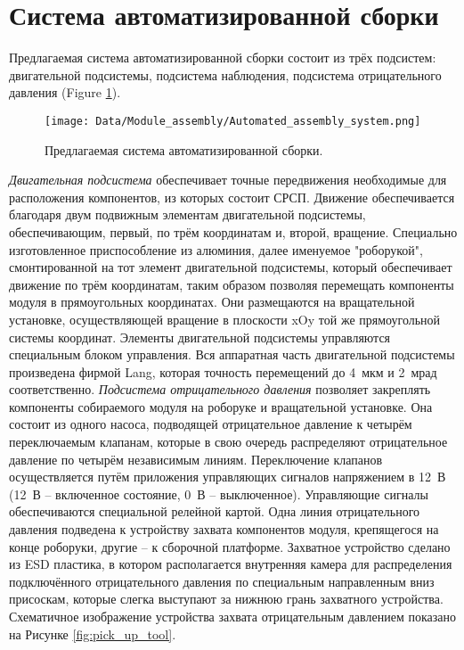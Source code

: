 \section{Система автоматизированной сборки}

Предлагаемая система автоматизированной сборки состоит из трёх подсистем: двигательной подсистемы, подсистема наблюдения, подсистема отрицательного давления (Figure \ref{fig:auto_assembly_system})\cite{AutomatedAssembly_tutorial}.

\begin{figure}[ht]\centering
\texttt{[image: Data/Module\_assembly/Automated\_assembly\_system.png]}
\caption{Предлагаемая система автоматизированной сборки.}
\label{fig:auto_assembly_system}
\end{figure}

\emph{Двигательная подсистема} обеспечивает точные передвижения необходимые для расположения компонентов, из которых состоит СРСП. Движение обеспечивается благодаря двум подвижным элементам двигательной подсистемы, обеспечивающим, первый, по трём координатам и, второй, вращение. Специально изготовленное приспособление из алюминия, далее именуемое "роборукой", смонтированной на тот элемент двигательной подсистемы, который обеспечивает движение по трём координатам, таким образом позволяя перемещать компоненты модуля в прямоугольных координатах. Они размещаются на вращательной установке, осуществляющей вращение в  плоскости xOy той же прямоугольной системы координат. Элементы двигательной подсистемы управляются специальным блоком управления. Вся аппаратная часть двигательной подсистемы произведена фирмой Lang, которая точность перемещений до 4~мкм и 2~мрад соответственно. \emph{Подсистема отрицательного давления} позволяет закреплять компоненты собираемого модуля на роборуке и вращательной установке. Она состоит из одного насоса, подводящей отрицательное давление к четырём переключаемым клапанам, которые в свою очередь распределяют отрицательное давление по четырём независимым линиям. Переключение клапанов осуществляется путём приложения управляющих сигналов напряжением в 12~В (12~В -- включенное состояние, 0~В -- выключенное). Управляющие сигналы обеспечиваются специальной релейной картой. Одна линия отрицательного давления подведена к устройству захвата компонентов модуля, крепящегося на конце роборуки, другие -- к сборочной платформе. Захватное устройство сделано из ESD пластика, в котором располагается внутренняя камера для распределения подключённого отрицательного давления по специальным направленным вниз присоскам, которые слегка выступают за нижнюю грань захватного устройства. Схематичное изображение устройства захвата отрицательным давлением показано на Рисунке \ref{fig:pick_up_tool}.

